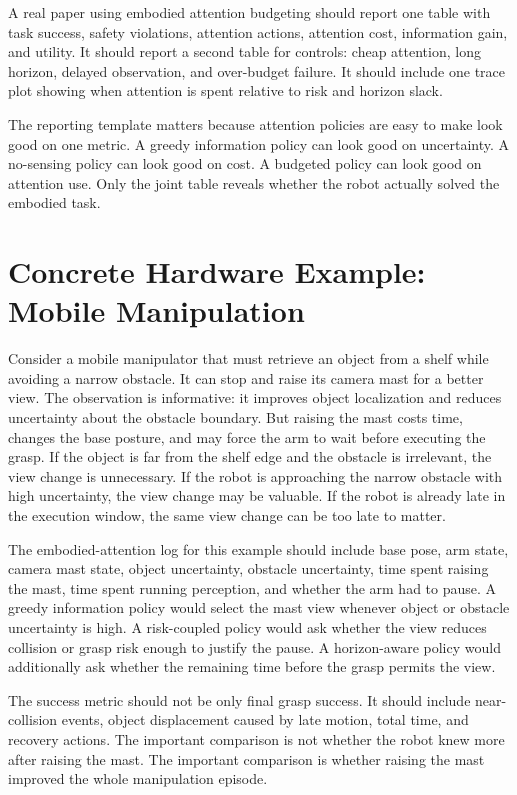 \documentclass{article}
\begin{document}
A real paper using embodied attention budgeting should report one table with
task success, safety violations, attention actions, attention cost, information
gain, and utility. It should report a second table for controls: cheap
attention, long horizon, delayed observation, and over-budget failure. It
should include one trace plot showing when attention is spent relative to risk
and horizon slack.

The reporting template matters because attention policies are easy to make
look good on one metric. A greedy information policy can look good on
uncertainty. A no-sensing policy can look good on cost. A budgeted policy can
look good on attention use. Only the joint table reveals whether the robot
actually solved the embodied task.

\section{Concrete Hardware Example: Mobile Manipulation}

Consider a mobile manipulator that must retrieve an object from a shelf while
avoiding a narrow obstacle. It can stop and raise its camera mast for a better
view. The observation is informative: it improves object localization and
reduces uncertainty about the obstacle boundary. But raising the mast costs
time, changes the base posture, and may force the arm to wait before executing
the grasp. If the object is far from the shelf edge and the obstacle is
irrelevant, the view change is unnecessary. If the robot is approaching the
narrow obstacle with high uncertainty, the view change may be valuable. If the
robot is already late in the execution window, the same view change can be too
late to matter.

The embodied-attention log for this example should include base pose, arm
state, camera mast state, object uncertainty, obstacle uncertainty, time spent
raising the mast, time spent running perception, and whether the arm had to
pause. A greedy information policy would select the mast view whenever object
or obstacle uncertainty is high. A risk-coupled policy would ask whether the
view reduces collision or grasp risk enough to justify the pause. A
horizon-aware policy would additionally ask whether the remaining time before
the grasp permits the view.

The success metric should not be only final grasp success. It should include
near-collision events, object displacement caused by late motion, total time,
and recovery actions. The important comparison is not whether the robot knew
more after raising the mast. The important comparison is whether raising the
mast improved the whole manipulation episode.
\end{document}
